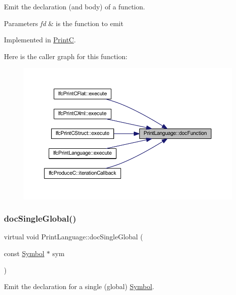 Emit the declaration (and body) of a function. 


\begin{DoxyParams}{Parameters}
{\em fd} & is the function to emit \\
\hline
\end{DoxyParams}


Implemented in \mbox{\hyperlink{class_print_c_a7a3890c28908f1229f8e94e0239fe0ea}{PrintC}}.

Here is the caller graph for this function\+:
\nopagebreak
\begin{figure}[H]
\begin{center}
\leavevmode
\includegraphics[width=350pt]{class_print_language_a93ebbf4cf20c65236ffca078fd5cbc21_icgraph}
\end{center}
\end{figure}
\mbox{\label{class_print_language_a2139aedceedf891b5702c0da1d905f08}} 
\subsubsection{\texorpdfstring{docSingleGlobal()}{docSingleGlobal()}}
{\footnotesize\ttfamily virtual void Print\+Language\+::doc\+Single\+Global (\begin{DoxyParamCaption}\item[{const \mbox{\hyperlink{class_symbol}{Symbol}} $\ast$}]{sym }\end{DoxyParamCaption})\hspace{0.3cm}{\ttfamily [pure virtual]}}



Emit the declaration for a single (global) \mbox{\hyperlink{class_symbol}{Symbol}}. 


